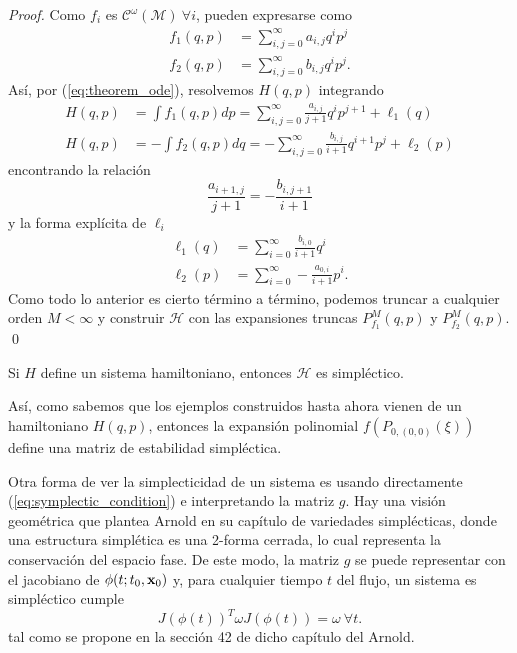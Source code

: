 \begin{proof}
Como $f_i$ es $\mathcal{C}^\omega(\mathcal{M}) \ \forall i$, pueden expresarse como
\begin{align*}
 f_1(q,p) &= \sum_{i,j = 0}^\infty a_{i,j} q^i p^j \\
 f_2(q,p) &= \sum_{i,j = 0}^\infty b_{i,j} q^i p^j. 
\end{align*}
Así, por (\ref{eq:theorem_ode}), resolvemos $H(q,p)$ integrando
\begin{align*}
 H(q,p) &= \int f_1(q,p) dp = \sum_{i,j = 0}^\infty \frac{a_{i,j}}{j+1} q^i p^{j+1} + \ell_1(q) \\
 H(q,p) &= -\int f_2(q,p) dq = -\sum_{i,j = 0}^\infty \frac{b_{i,j}}{i+1} q^{i+1} p^j + \ell_2(p)
\end{align*}
encontrando la relación 
\begin{equation*}
 \frac{a_{i+1,j}}{j+1} = - \frac{b_{i,j+1}}{i+1} 
\end{equation*}
y la forma explícita de $\ell_i$
\begin{align*}
 \ell_1(q) &= \sum_{i=0}^\infty \frac{b_{i,0}}{i+1} q^i \\
 \ell_2(p) &= \sum_{i=0}^\infty -\frac{a_{0,i}}{i+1} p^i.
\end{align*}
Como todo lo anterior es cierto término a término, podemos truncar a cualquier orden $M < \infty$ y construir $\mathcal{H}$ con las expansiones truncas $P_{f_1}^M(q,p)$ y $P_{f_2}^M(q,p)$. \qed
\end{proof}

\begin{corolario}
Si $H$ define un sistema hamiltoniano, entonces $\mathcal{H}$ es simpléctico. 
\end{corolario}

Así, como sabemos que los ejemplos construidos hasta ahora vienen de un hamiltoniano $H(q,p)$, entonces la expansión polinomial $f(P_{0,(0,0)}(\xi))$ define una matriz de estabilidad simpléctica. 

Otra forma de ver la simplecticidad de un sistema es usando directamente (\ref{eq:symplectic_condition}) e interpretando la matriz $g$. Hay una visión geométrica que plantea Arnold \cite{Arnold1989} en su capítulo de variedades simplécticas, donde una estructura simplética es una 2-forma cerrada, lo cual representa la conservación del espacio fase. De este modo, la matriz $g$ se puede representar con el jacobiano de $\phi(t;t_0,\mathbf{x}_0)$ y, para cualquier tiempo $t$ del flujo, un sistema es simpléctico cumple
\begin{equation}
 J(\phi(t))^T \omega J(\phi(t)) = \omega \ \forall t.
 \label{eq:sympletic_flow}
\end{equation} 
tal como se propone en la sección 42 de dicho capítulo del Arnold.

